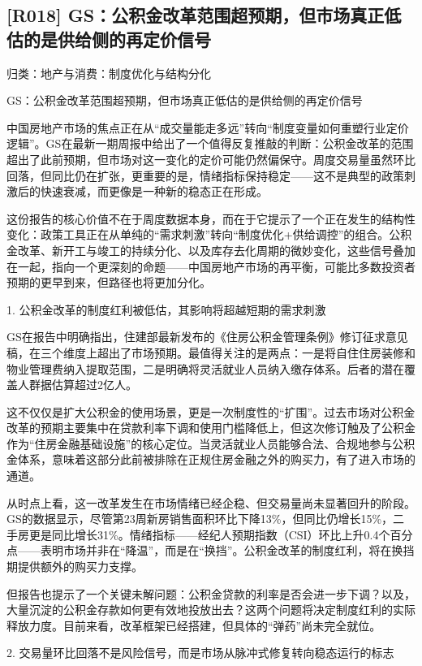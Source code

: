 \documentclass[11pt]{ctexart}
\begin{document}
\subsection{[R018] GS：公积金改革范围超预期，但市场真正低估的是供给侧的再定价信号}
{\small\color{refgray}归类：地产与消费：制度优化与结构分化}

GS：公积金改革范围超预期，但市场真正低估的是供给侧的再定价信号

中国房地产市场的焦点正在从“成交量能走多远”转向“制度变量如何重塑行业定价逻辑”。GS在最新一期周报中给出了一个值得反复推敲的判断：公积金改革的范围超出了此前预期，但市场对这一变化的定价可能仍然偏保守。周度交易量虽然环比回落，但同比仍在扩张，更重要的是，情绪指标保持稳定——这不是典型的政策刺激后的快速衰减，而更像是一种新的稳态正在形成。

这份报告的核心价值不在于周度数据本身，而在于它提示了一个正在发生的结构性变化：政策工具正在从单纯的“需求刺激”转向“制度优化+供给调控”的组合。公积金改革、新开工与竣工的持续分化、以及库存去化周期的微妙变化，这些信号叠加在一起，指向一个更深刻的命题——中国房地产市场的再平衡，可能比多数投资者预期的更早到来，但路径也将更加分化。

1. 公积金改革的制度红利被低估，其影响将超越短期的需求刺激

GS在报告中明确指出，住建部最新发布的《住房公积金管理条例》修订征求意见稿，在三个维度上超出了市场预期。最值得关注的是两点：一是将自住住房装修和物业管理费纳入提取范围，二是明确将灵活就业人员纳入缴存体系。后者的潜在覆盖人群据估算超过2亿人。

这不仅仅是扩大公积金的使用场景，更是一次制度性的“扩围”。过去市场对公积金改革的预期主要集中在贷款利率下调和使用门槛降低上，但这次修订触及了公积金作为“住房金融基础设施”的核心定位。当灵活就业人员能够合法、合规地参与公积金体系，意味着这部分此前被排除在正规住房金融之外的购买力，有了进入市场的通道。

从时点上看，这一改革发生在市场情绪已经企稳、但交易量尚未显著回升的阶段。GS的数据显示，尽管第23周新房销售面积环比下降13\%，但同比仍增长15\%，二手房更是同比增长31\%。情绪指标——经纪人预期指数（CSI）环比上升0.4个百分点——表明市场并非在“降温”，而是在“换挡”。公积金改革的制度红利，将在换挡期提供额外的购买力支撑。

但报告也提示了一个关键未解问题：公积金贷款的利率是否会进一步下调？以及，大量沉淀的公积金存款如何更有效地投放出去？这两个问题将决定制度红利的实际释放力度。目前来看，改革框架已经搭建，但具体的“弹药”尚未完全就位。

2. 交易量环比回落不是风险信号，而是市场从脉冲式修复转向稳态运行的标志
\end{document}
